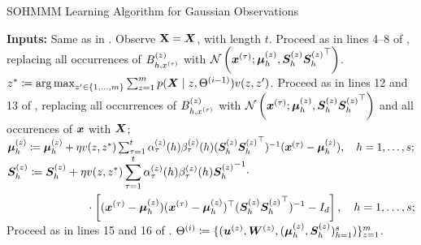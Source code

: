 \begin{algorithm}
	\caption{SOHMMM Learning Algorithm for Gaussian Observations}
	\label{alg:sohmmm_gaussian}
	
	\begin{algorithmic}[1]
		\State \textbf{Inputs:} Same as in .
		\vspace{0.3cm}
		\vspace{0.3cm}
		\State Observe ${\mathbf{X}} = {\bm{X}}$, with length $t$.
		\vspace{0.3cm}
		\State Proceed as in lines 4--8 of , replacing all occurrences of ${B}^{(z)}_{h,x^{(\tau)}}$ with $\mathcal{N}\left({\bm{x}}^{(\tau)}; {\bm{\mu}}^{(z)}_h, {\bm{S}}^{(z)}_h {{\bm{S}}^{(z)}_h}^\top\right)$.
		\vspace{0.3cm}
		\State $z^* \coloneqq  \operatorname*{arg\,max}_{z' \in \{1,\dots,m\}} \sum_{z=1}^m p({\bm{X}} \mid z, \Theta^{(i-1)})v(z, z')$.
		\vspace{0.3cm}
		\vspace{0.3cm}
		\State Proceed as in lines 12 and 13 of , replacing all occurrences of ${B}^{(z)}_{h,x^{(\tau)}}$ with $\mathcal{N}\left({\bm{x}}^{(\tau)}; {\bm{\mu}}^{(z)}_h, {\bm{S}}^{(z)}_h {{\bm{S}}^{(z)}_h}^\top\right)$ and all occurences of ${\bm{x}}$ with ${\bm{X}}$;
		\vspace{0.3cm}
		\State ${\bm{\mu}}^{(z)}_h \coloneqq {\bm{\mu}}^{(z)}_h + \eta v(z, z^*) \sum_{\tau=1}^t \alpha_{\tau}^{(z)}(h) \beta_{\tau}^{(z)}(h) ({\bm{S}}^{(z)}_h {{\bm{S}}^{(z)}_h} ^\top)^{-1} ({\bm{x}}^{(\tau)} - {\bm{\mu}}^{(z)}_h), \quad h = 1, \dots, s;$
		\vspace{0.3cm}
		\State $\begin{aligned}
			{\bm{S}}^{(z)}_h \coloneqq {\bm{S}}^{(z)}_h + \eta &v(z, z^*) \sum_{\tau=1}^t \alpha_{\tau}^{(z)}(h) \beta_{\tau}^{(z)}(h) {{\bm{S}}^{(z)}_h}^{-1} \cdot \\
			&\cdot \left[ ({\bm{x}}^{(\tau)} - {\bm{\mu}}^{(z)}_h) ({\bm{x}}^{(\tau)} - {\bm{\mu}}^{(z)}_h)^\top ({\bm{S}}^{(z)}_h {{\bm{S}}^{(z)}_h} ^\top)^{-1} - I_d\right], \quad h = 1, \dots, s;
			\end{aligned}$
		\vspace{0.3cm}
		\State Proceed as in lines 15 and 16 of .
		\vspace{0.3cm}
		\EndFor
		\vspace{0.3cm}
		\State $\Theta^{(i)} \coloneqq \lbrace ({\bm{u}}^{(z)}, {\bm{W}}^{(z)}, ({\bm{\mu}}^{(z)}_h, {\bm{S}}^{(z)}_h)_{h=1}^s) \rbrace_{z=1}^m$.
		\vspace{0.3cm}
		\EndFor
		
	\end{algorithmic}
\end{algorithm}

